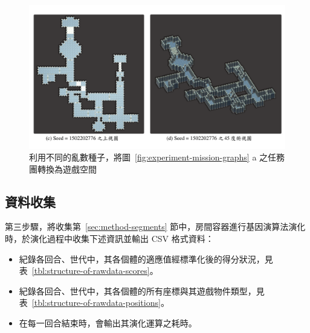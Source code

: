 \begin{landscape}
  \begin{figure}[H]
    \begin{center}
      \includegraphics[width=1.05\linewidth]{figures/experiments/experiment-spaces-1502202776.pdf}
      \caption{利用不同的亂數種子，將圖~\protect\ref{fig:experiment-mission-graphs} a 之任務團轉換為遊戲空間}
    \end{center}
  \end{figure}
\end{landscape}

\subsection{資料收集}
\label{ssec:experiment-diagram-datacollection}

第三步驟，將收集第~\ref{sec:method-segments} 節中，房間容器進行基因演算法演化時，於演化過程中收集下述資訊並輸出 CSV 格式資料：

\begin{itemize}
  \vspace{-5mm}
  \setlength\itemsep{-0.5em}
  \item 紀錄各回合、世代中，其各個體的適應值經標準化後的得分狀況，見表~\ref{tbl:structure-of-rawdata-scores}。
  \item 紀錄各回合、世代中，其各個體的所有座標與其遊戲物件類型，見表~\ref{tbl:structure-of-rawdata-positions}。
  \item 在每一回合結束時，會輸出其演化運算之耗時。
\end{itemize}

